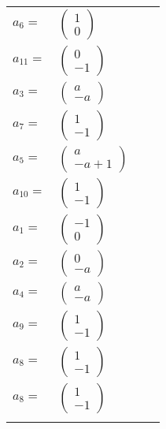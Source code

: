 \documentclass[1p]{elsarticle_modified}
\theoremstyle{definition}
\begin{document}
\begin{tabular}{m{7pt} m{180pt} m{7pt} m{180pt} }
\flushright $a_{6}=$&$\begin{pmatrix}1\\0\end{pmatrix}$ \\
\flushright $a_{11}=$&$\begin{pmatrix}0\\-1\end{pmatrix}$ \\
\flushright $a_{3}=$&$\begin{pmatrix}a\\- a\end{pmatrix}$ \\
\flushright $a_{7}=$&$\begin{pmatrix}1\\-1\end{pmatrix}$ \\
\flushright $a_{5}=$&$\begin{pmatrix}a\\- a+1\end{pmatrix}$ \\
\flushright $a_{10}=$&$\begin{pmatrix}1\\-1\end{pmatrix}$ \\
\flushright $a_{1}=$&$\begin{pmatrix}-1\\0\end{pmatrix}$ \\
\flushright $a_{2}=$&$\begin{pmatrix}0\\- a\end{pmatrix}$ \\
\flushright $a_{4}=$&$\begin{pmatrix}a\\- a\end{pmatrix}$ \\
\flushright $a_{9}=$&$\begin{pmatrix}1\\-1\end{pmatrix}$ \\
\flushright $a_{8}=$&$\begin{pmatrix}1\\-1\end{pmatrix}$\\ \flushright $a_{8}=$&$\begin{pmatrix}1\\-1\end{pmatrix}$\\&\end{tabular}
\end{document}
